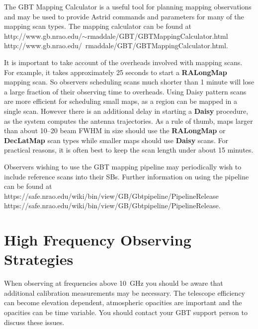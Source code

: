 The \gls{GBT} Mapping Calculator is a useful tool for planning mapping
observations and may be used to provide \gls{Astrid} commands and
parameters for many of the mapping scan types.  The mapping calculator can be
found at \htmladdnormallink
{http://www.gb.nrao.edu/$\sim$rmaddale/GBT/GBTMappingCalculator.html}
{http://www.gb.nrao.edu/~rmaddale/GBT/GBTMappingCalculator.html}.

It is important to take account of the overheads involved with mapping scans.
For example, it takes approximately 25 seconds to start a
{\bfseries{\textcolor{pythonKeywords}{RALongMap}}} mapping scan. So observers
scheduling scans much shorter than 1 minute will lose a large fraction of their
observing time to overheads.  Using Daisy pattern scans are more efficient for
scheduling small maps, as a region can be mapped in a single scan.  However
there is an additional delay in starting a
{\bfseries{\textcolor{pythonKeywords}{Daisy}}} procedure, as the system computes
the antenna trajectories. As a rule of thumb, maps larger than about 10--20 beam
\gls{FWHM} in size should use the
{\bfseries{\textcolor{pythonKeywords}{RALongMap}}} or
{\bfseries{\textcolor{pythonKeywords}{DecLatMap}}} scan types while smaller maps
should use 
{\bfseries{\textcolor{pythonKeywords}{Daisy}}} scans. For practical reasons, it
is often best to keep the scan length under about 15 minutes.

Observers wishing to use the \gls{GBT} mapping pipeline may periodically wish
to include reference scans into their \glsdesc{SB}s.
Further information on using the pipeline can be found at\\ \htmladdnormallink
{https://safe.nrao.edu/wiki/bin/view/GB/Gbtpipeline/PipelineRelease}
{https://safe.nrao.edu/wiki/bin/view/GB/Gbtpipeline/PipelineRelease}.



\section{High Frequency Observing Strategies}

When observing at frequencies above 10~GHz you should be aware that additional
calibration measurements may be necessary.  The telescope efficiency can become
elevation dependent, atmospheric opacities are important and the opacities can
be time variable.  You should contact your \gls{GBT} support person to discuss
these issues.

